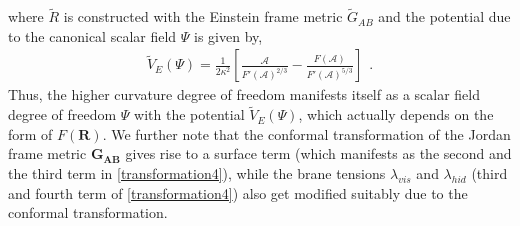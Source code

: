 \documentclass{article}
\begin{document}
where $\tilde{R}$ is constructed with the Einstein frame metric $\tilde{G}_{AB}$ and the potential due to the canonical scalar field $\Psi$ is given by,
\begin{eqnarray}
 \tilde{V}_E(\Psi) = \frac{1}{2\kappa^2}\left[\frac{\mathcal{A}}{F'(\mathcal{A})^{2/3}} - \frac{F(\mathcal{A})}{F'(\mathcal{A})^{5/3}}\right]~~.
 \label{bulk scalar potential}
\end{eqnarray}
Thus, the higher curvature 
degree of freedom manifests itself as a scalar field degree of freedom $\Psi$ with the potential $\tilde{V}_E(\Psi)$, which actually depends on the form of $F(\mathbf{R})$.
We further note that the conformal transformation of the Jordan frame metric $\mathbf{G_{AB}}$ gives rise to a surface term (which manifests as the second and the third term in \ref{transformation4}), while the brane tensions $\lambda_{vis}$ and $\lambda_{hid}$ (third and fourth term of \ref{transformation4}) also get modified suitably due to the conformal transformation. 
\end{document}

